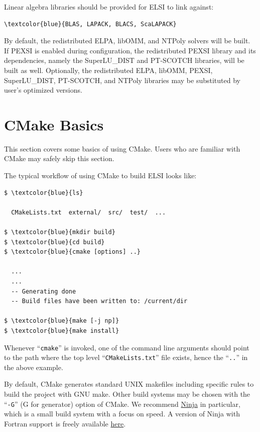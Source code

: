 \documentclass{report}
\begin{document}
Linear algebra libraries should be provided for ELSI to link against:
\begin{Verbatim}[commandchars=\\\{\}]
\textcolor{blue}{BLAS, LAPACK, BLACS, ScaLAPACK}
\end{Verbatim}

By default, the redistributed ELPA, libOMM, and NTPoly solvers will be built.  If PEXSI is enabled during configuration, the redistributed PEXSI library and its dependencies, namely the SuperLU\_DIST and PT-SCOTCH libraries, will be built as well.  Optionally, the redistributed ELPA, libOMM, PEXSI, SuperLU\_DIST, PT-SCOTCH, and NTPoly libraries may be substituted by user's optimized versions.

\section{CMake Basics}
\label{sec:cmake}
This section covers some basics of using CMake.  Users who are familiar with CMake may safely skip this section.

The typical workflow of using CMake to build ELSI looks like:
\begin{tcolorbox}
\begin{Verbatim}[commandchars=\\\{\}]
$ \textcolor{blue}{ls}

  CMakeLists.txt  external/  src/  test/  ...

$ \textcolor{blue}{mkdir build}
$ \textcolor{blue}{cd build}
$ \textcolor{blue}{cmake [options] ..}

  ...
  ...
  -- Generating done
  -- Build files have been written to: /current/dir

$ \textcolor{blue}{make [-j np]}
$ \textcolor{blue}{make install}
\end{Verbatim}
\end{tcolorbox}

Whenever ``\verb+cmake+'' is invoked, one of the command line arguments should point to the path where the top level ``\verb+CMakeLists.txt+'' file exists, hence the ``\verb+..+'' in the above example.

By default, CMake generates standard UNIX makefiles including specific rules to build the project with GNU make.  Other build systems may be chosen with the ``\verb+-G+'' (G for generator) option of CMake.  We recommend \href{http://ninja-build.org}{Ninja} in particular, which is a small build system with a focus on speed.  A version of Ninja with Fortran support is freely available \href{http://github.com/Kitware/ninja}{here}.
\end{document}
